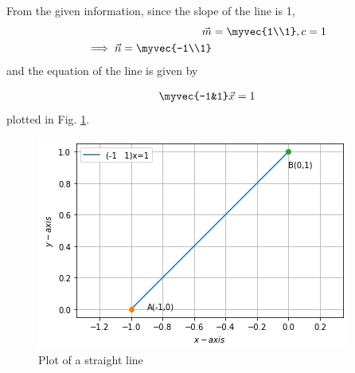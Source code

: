 From the given information, since the 
slope of the line is 1, 
\begin{align}
        \vec{m}&=\myvec{1\\1},  c=1
\\
 \implies \vec{n}=  \myvec{-1\\1}     
\end{align}
and the equation of the line is given by

\begin{align}
\myvec{-1&1}\vec{x} =1     
\end{align}
%
plotted in Fig. \ref{5/1/fig}.
%
\begin{figure}[!ht]
\includegraphics[width=\columnwidth]{Line.png}
\caption{ Plot of a straight line  }
\label{5/1/fig}
\end{figure}

